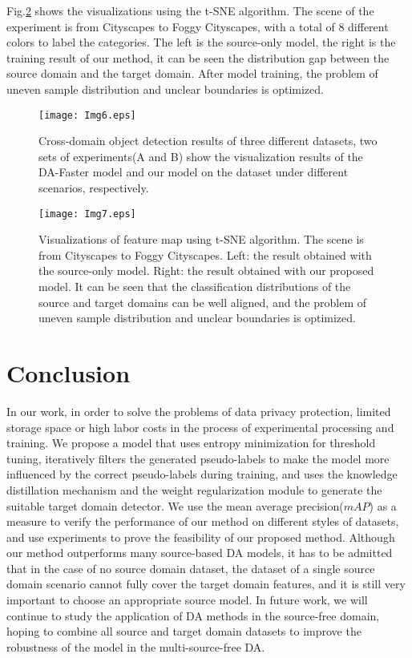 \documentclass[sn-mathphys]{sn-jnl}%
\theoremstyle{thmstyleone}%
\theoremstyle{thmstyletwo}%
\theoremstyle{thmstylethree}%
\begin{document}
Fig.\ref{fig7} shows the visualizations using the t-SNE algorithm. The scene of the experiment is from Cityscapes to Foggy Cityscapes, with a total of 8 different colors to label the categories. The left is the source-only model, the right is the training result of our method, it can be seen the distribution gap between the source domain and the target domain. After model training, the problem of uneven sample distribution and unclear boundaries is optimized.
\begin{figure}[t]
	\centering
	\texttt{[image: Img6.eps]}
	\caption{Cross-domain object detection results of three different datasets, two sets of experiments(A and B) show the visualization results of the DA-Faster model and our model on the dataset under different scenarios, respectively.} \label{fig6}
\end{figure}

\begin{figure}
	\centering
	\texttt{[image: Img7.eps]}
	\caption{Visualizations of feature map using t-SNE algorithm. The scene is from Cityscapes to Foggy Cityscapes. Left: the result obtained with the source-only model. Right: the result obtained with our proposed model. It can be seen that the classification distributions of the source and target domains can be well aligned, and the problem of uneven sample distribution and unclear boundaries is optimized.} \label{fig7}
\end{figure}

%

\section{Conclusion}\label{sec:sec5}

In our work, in order to solve the problems of data privacy protection, limited storage space or high labor costs in the process of experimental processing and training. We propose a model that uses entropy minimization for threshold tuning, iteratively filters the generated pseudo-labels to make the model more influenced by the correct pseudo-labels during training, and uses the knowledge distillation mechanism and the weight regularization module to generate the suitable target domain detector. We use the mean average precision($mAP$) as a measure to verify the performance of our method on different styles of datasets, and use experiments to prove the feasibility of our proposed method. Although our method outperforms many source-based DA models, it has to be admitted that in the case of no source domain dataset, the dataset of a single source domain scenario cannot fully cover the target domain features, and it is still very important to choose an appropriate source model. In future work, we will continue to study the application of DA methods in the source-free domain, hoping to combine all source and target domain datasets to improve the robustness of the model in the multi-source-free DA.
\end{document}
